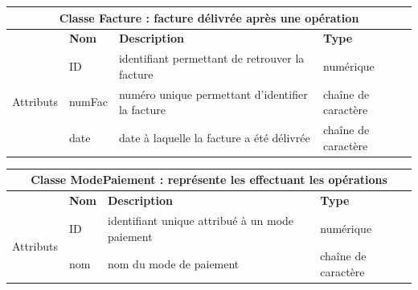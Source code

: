 		
			\begin{center}
			{\renewcommand{\arraystretch}{1.5}\begin{tabularx}{\textwidth}{|l|l|l|X|}
					\hline
					\multicolumn{4}{|c|}{\textbf{Classe Facture : facture délivrée après une opération}} \\
					\hline
					
					& \textbf{Nom} & \textbf{Description} & \textbf{Type} \\
					\multirow{3}{*}{Attributs} & ID & identifiant permettant de retrouver la facture & numérique \\
					
					& numFac & numéro unique permettant d'identifier la facture &  chaîne de caractère \\
					
					& date & date à laquelle la facture a été délivrée & chaîne de caractère \\
					
					\hline
			\end{tabularx}}
			\label{table8}
		\end{center}
		
		\begin{center}
			{\renewcommand{\arraystretch}{1.5}\begin{tabularx}{\textwidth}{|l|l|l|X|}
					\hline
					\multicolumn{4}{|c|}{\textbf{Classe ModePaiement : représente les effectuant les opérations}} \\
					
					\hline
					
					& \textbf{Nom} & \textbf{Description} & \textbf{Type} \\
					\multirow{3}{*}{Attributs} & ID & identifiant unique attribué à un mode paiement  & numérique \\
					
					& nom & nom du mode de paiement &  chaîne de caractère \\
					
					\hline
			\end{tabularx}}
			\label{table9}
		\end{center}
		
